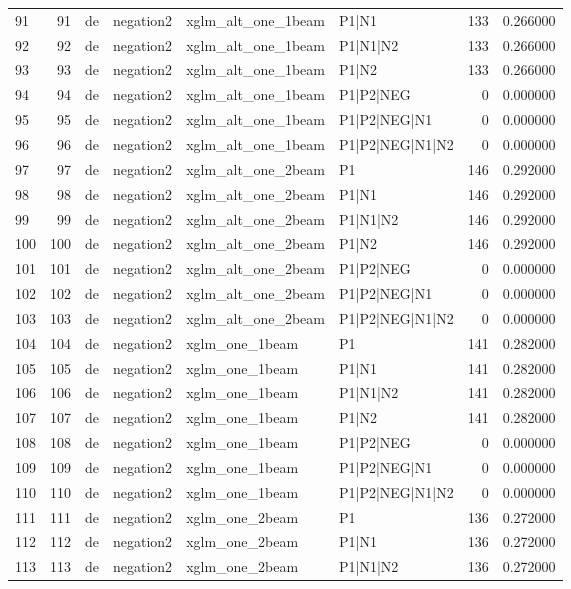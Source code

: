 \begin{tabular}{lrllllrr}
91 & 91 & de & negation2 & xglm_alt_one_1beam & P1|N1 & 133 & 0.266000 \\
92 & 92 & de & negation2 & xglm_alt_one_1beam & P1|N1|N2 & 133 & 0.266000 \\
93 & 93 & de & negation2 & xglm_alt_one_1beam & P1|N2 & 133 & 0.266000 \\
94 & 94 & de & negation2 & xglm_alt_one_1beam & P1|P2|NEG & 0 & 0.000000 \\
95 & 95 & de & negation2 & xglm_alt_one_1beam & P1|P2|NEG|N1 & 0 & 0.000000 \\
96 & 96 & de & negation2 & xglm_alt_one_1beam & P1|P2|NEG|N1|N2 & 0 & 0.000000 \\
97 & 97 & de & negation2 & xglm_alt_one_2beam & P1 & 146 & 0.292000 \\
98 & 98 & de & negation2 & xglm_alt_one_2beam & P1|N1 & 146 & 0.292000 \\
99 & 99 & de & negation2 & xglm_alt_one_2beam & P1|N1|N2 & 146 & 0.292000 \\
100 & 100 & de & negation2 & xglm_alt_one_2beam & P1|N2 & 146 & 0.292000 \\
101 & 101 & de & negation2 & xglm_alt_one_2beam & P1|P2|NEG & 0 & 0.000000 \\
102 & 102 & de & negation2 & xglm_alt_one_2beam & P1|P2|NEG|N1 & 0 & 0.000000 \\
103 & 103 & de & negation2 & xglm_alt_one_2beam & P1|P2|NEG|N1|N2 & 0 & 0.000000 \\
104 & 104 & de & negation2 & xglm_one_1beam & P1 & 141 & 0.282000 \\
105 & 105 & de & negation2 & xglm_one_1beam & P1|N1 & 141 & 0.282000 \\
106 & 106 & de & negation2 & xglm_one_1beam & P1|N1|N2 & 141 & 0.282000 \\
107 & 107 & de & negation2 & xglm_one_1beam & P1|N2 & 141 & 0.282000 \\
108 & 108 & de & negation2 & xglm_one_1beam & P1|P2|NEG & 0 & 0.000000 \\
109 & 109 & de & negation2 & xglm_one_1beam & P1|P2|NEG|N1 & 0 & 0.000000 \\
110 & 110 & de & negation2 & xglm_one_1beam & P1|P2|NEG|N1|N2 & 0 & 0.000000 \\
111 & 111 & de & negation2 & xglm_one_2beam & P1 & 136 & 0.272000 \\
112 & 112 & de & negation2 & xglm_one_2beam & P1|N1 & 136 & 0.272000 \\
113 & 113 & de & negation2 & xglm_one_2beam & P1|N1|N2 & 136 & 0.272000 \\

\end{tabular}
